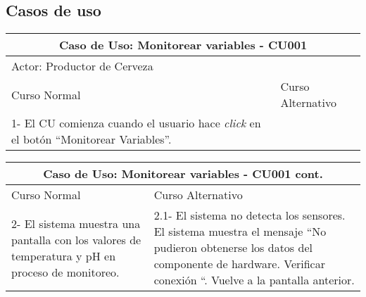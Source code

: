     
 
    \begin{minipage}{0.95\textwidth}
    \subsection{Casos de uso}
    \hfill \break
    \hfill \break
    \begin{center}
    \begin{tabularx}{\textwidth}{ | X | X |}
        \hline
        \multicolumn{2}{|c|}{\textbf{Caso de Uso: Monitorear variables - CU001}} \\
        \hline
        \multicolumn{2}{|l|}{Actor: Productor de Cerveza} \\
        \hline
        Curso Normal & Curso Alternativo \\
        \hline
        1- El CU comienza cuando el usuario hace \textit{click} en el botón “Monitorear Variables”. & \\
        \hline
    \end{tabularx}
    \label{CU001a}
    \end{center}
    \end{minipage}    
        
    \begin{minipage}{0.95\textwidth}
    \begin{center}
    \begin{tabularx}{\textwidth}{ | X | X |}
        \hline
        \multicolumn{2}{|c|}{\textbf{Caso de Uso: Monitorear variables - CU001 cont.}} \\
        \hline
        Curso Normal & Curso Alternativo \\
        \hline
        
        2- El sistema muestra una pantalla con los valores de temperatura y pH en proceso de monitoreo. & 2.1- El sistema no detecta los sensores. 
        El sistema muestra el mensaje “No pudieron obtenerse los datos del componente de hardware. Verificar conexión “. Vuelve a la pantalla anterior.
        \\
        \hline
    \end{tabularx}
    \label{CU001b}
    \end{center}
    \end{minipage}


